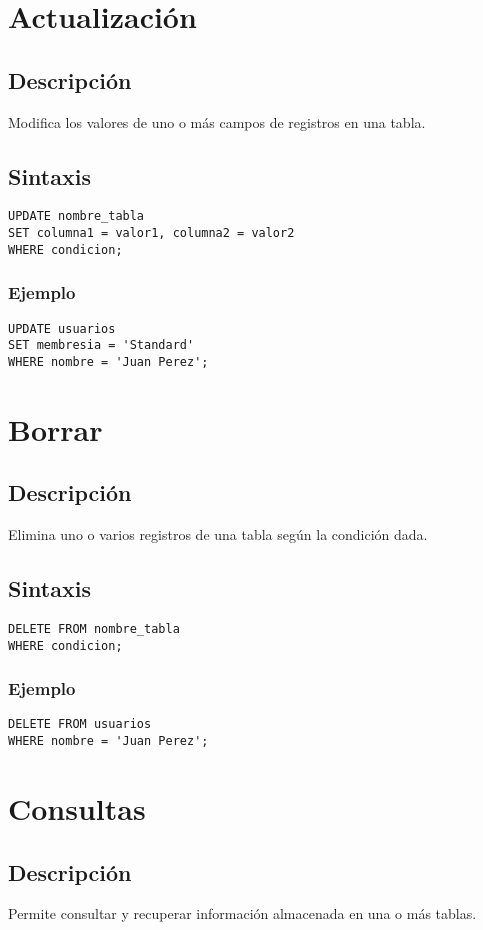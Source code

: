 \documentclass[12pt, a4paper]{article}
\begin{document}
\section{Actualización}
\subsection{Descripción}
Modifica los valores de uno o más campos de registros en una tabla.
\subsection{Sintaxis}
\begin{lstlisting}
UPDATE nombre_tabla
SET columna1 = valor1, columna2 = valor2
WHERE condicion;
\end{lstlisting}
\subsubsection{Ejemplo}
\begin{lstlisting}
UPDATE usuarios
SET membresia = 'Standard'
WHERE nombre = 'Juan Perez';
\end{lstlisting}

\section{Borrar}
\subsection{Descripción}
Elimina uno o varios registros de una tabla según la condición dada.
\subsection{Sintaxis}
\begin{lstlisting}
DELETE FROM nombre_tabla
WHERE condicion;
\end{lstlisting}
\subsubsection{Ejemplo}
\begin{lstlisting}
DELETE FROM usuarios
WHERE nombre = 'Juan Perez';
\end{lstlisting}

\section{Consultas}
\subsection{Descripción}
Permite consultar y recuperar información almacenada en una o más tablas.
\end{document}
